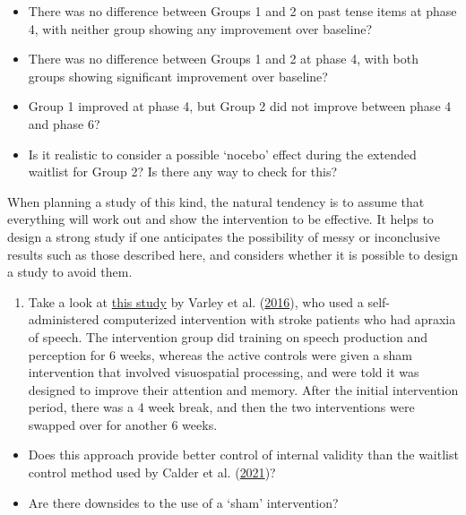 \documentclass{krantz}
\providecommand{\tightlist}{%
\setlength{\itemsep}{0pt}\setlength{\parskip}{0pt}}
\begin{document}
\begin{itemize}
\tightlist
\item
  There was no difference between Groups 1 and 2 on past tense items at phase 4, with neither group showing any improvement over baseline?\\
\item
  There was no difference between Groups 1 and 2 at phase 4, with both groups showing significant improvement over baseline?\\
\item
  Group 1 improved at phase 4, but Group 2 did not improve between phase 4 and phase 6?\\
\item
  Is it realistic to consider a possible `nocebo' effect during the extended waitlist for Group 2? Is there any way to check for this?
\end{itemize}

When planning a study of this kind, the natural tendency is to assume that everything will work out and show the intervention to be effective. It helps to design a strong study if one anticipates the possibility of messy or inconclusive results such as those described here, and considers whether it is possible to design a study to avoid them.

\begin{enumerate}
\def\labelenumi{\arabic{enumi}.}
\setcounter{enumi}{1}
\tightlist
\item
  Take a look at \href{https://eprints.whiterose.ac.uk/112815/1/Varley\%20et\%20al_Computerized\%20therapy\%20for\%20AOS.pdf}{this study} by Varley et al. (\protect\hyperlink{ref-varley2016}{2016}), who used a self-administered computerized intervention with stroke patients who had apraxia of speech. The intervention group did training on speech production and perception for 6 weeks, whereas the active controls were given a sham intervention that involved visuospatial processing, and were told it was designed to improve their attention and memory. After the initial intervention period, there was a 4 week break, and then the two interventions were swapped over for another 6 weeks.
\end{enumerate}

\begin{itemize}
\tightlist
\item
  Does this approach provide better control of internal validity than the waitlist control method used by Calder et al. (\protect\hyperlink{ref-calder2021}{2021})?
\item
  Are there downsides to the use of a `sham' intervention?
\end{itemize}
\end{document}
